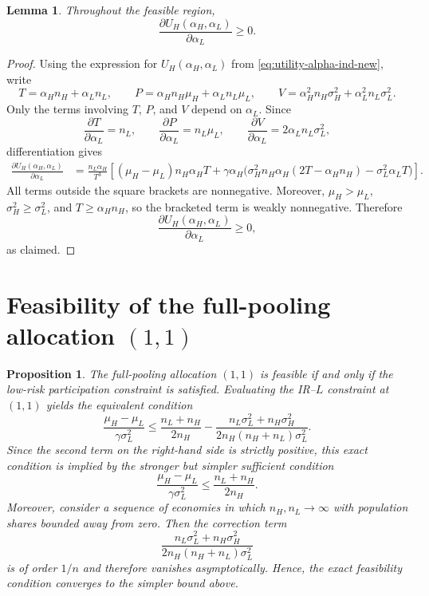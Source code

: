 \documentclass[a4paper,12pt]{article}
\newtheorem{proposition}[theorem]{Proposition}
\newtheorem{lemma}[theorem]{Lemma}
\theoremstyle{definition}
\theoremstyle{remark}
\newcommand{\1}{\mathbf{1}}
\begin{document}
\begin{lemma}
\label{lem:UH-vertical-monotone}
Throughout the feasible region,
\[
\frac{\partial U_H(\alpha_H,\alpha_L)}{\partial \alpha_L}\ge 0.
\]
\end{lemma}

\begin{proof}
Using the expression for \(U_H(\alpha_H,\alpha_L)\) from
\eqref{eq:utility-alpha-ind-new}, write
\[
T=\alpha_H n_H+\alpha_L n_L,
\qquad
P=\alpha_H n_H\mu_H+\alpha_L n_L\mu_L,
\qquad
V=\alpha_H^2 n_H\sigma_H^2+\alpha_L^2 n_L\sigma_L^2 .
\]
Only the terms involving \(T\), \(P\), and \(V\) depend on \(\alpha_L\). Since
\[
\frac{\partial T}{\partial \alpha_L}=n_L,
\qquad
\frac{\partial P}{\partial \alpha_L}=n_L\mu_L,
\qquad
\frac{\partial V}{\partial \alpha_L}=2\alpha_L n_L\sigma_L^2,
\]
differentiation gives
\begin{align*}
\frac{\partial U_H(\alpha_H,\alpha_L)}{\partial \alpha_L}
&=
\frac{n_L\alpha_H}{T^3}
\left[
(\mu_H-\mu_L)n_H\alpha_H T
+
\gamma\alpha_H
\Big(
\sigma_H^2 n_H\alpha_H(2T-\alpha_H n_H)
-\sigma_L^2\alpha_L T
\Big)
\right].
\end{align*}
All terms outside the square brackets are nonnegative. Moreover,
\(\mu_H>\mu_L\), \(\sigma_H^2\ge \sigma_L^2\), and \(T\ge \alpha_H n_H\), so the
bracketed term is weakly nonnegative. Therefore
\[
\frac{\partial U_H(\alpha_H,\alpha_L)}{\partial \alpha_L}\ge 0,
\]
as claimed.
\end{proof}

\section{Feasibility of the full-pooling allocation \((1,1)\)}
\label{app:pooling-feasibility}

\begin{proposition}\label{prop:pooling-feasibility-app}
The full-pooling allocation \((1,1)\) is feasible if and only if the low-risk participation constraint is satisfied. Evaluating the IR--\(L\) constraint at \((1,1)\) yields the equivalent condition
\begin{equation}\label{eq:(1,1)-exact}
    \frac{\mu_H - \mu_L}{\gamma \sigma_L^2}
    \le
    \frac{n_L + n_H}{2 n_H}
    -
    \frac{n_L\sigma_L^2 + n_H\sigma_H^2}
         {2 n_H (n_H+n_L)\sigma_L^2}.
\end{equation}
Since the second term on the right-hand side is strictly positive, this exact condition is implied by the stronger but simpler sufficient condition
\begin{equation}\label{eq:(1,1)-simple}
    \frac{\mu_H - \mu_L}{\gamma \sigma_L^2}
    \le
    \frac{n_L + n_H}{2 n_H}.
\end{equation}
Moreover, consider a sequence of economies in which \(n_H,n_L \to \infty\) with population shares bounded away from zero. Then the correction term
\[
\frac{n_L\sigma_L^2 + n_H\sigma_H^2}{2 n_H (n_H+n_L)\sigma_L^2}
\]
is of order \(1/n\) and therefore vanishes asymptotically. Hence, the exact feasibility condition converges to the simpler bound above.
\end{proposition}
\end{document}
